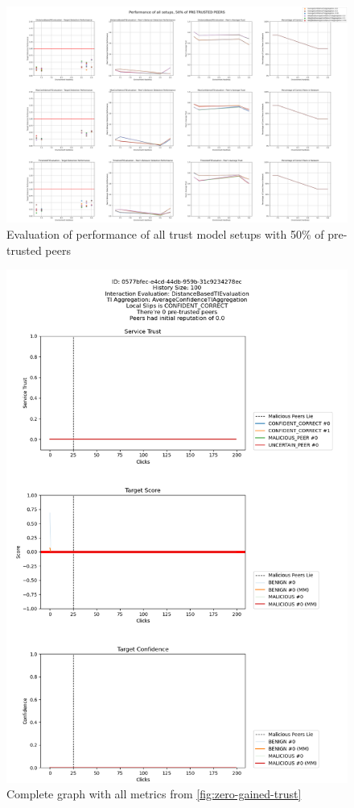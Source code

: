 \begin{figure}
    \centering
    \includegraphics[width=0.9\paperwidth, angle=90]{assets/50_all_metrics.png}
    \caption{Evaluation of performance of all trust model setups with 50\% of pre-trusted peers}
    \label{fig:performance-all-setups-50-pretrusted}
\end{figure}

\begin{figure}
    \centering
    \includegraphics[width=1.0\textwidth]{assets/zero_gained_trust_all.png}
    \caption{Complete graph with all metrics from \ref{fig:zero-gained-trust}}
    \label{fig:zero-gained-trust-all}
\end{figure}